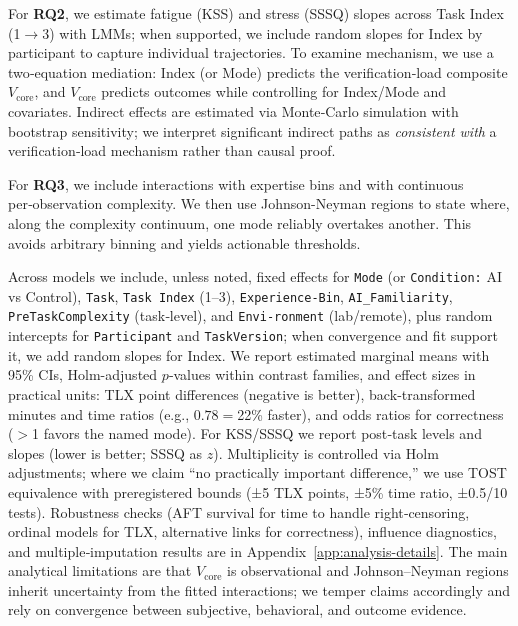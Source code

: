 \documentclass[sigconf]{acmart}
\begin{document}
For \textbf{RQ2}, we estimate fatigue (KSS) and stress (SSSQ) slopes across Task Index (1$\rightarrow$3) with LMMs; when supported, we include random slopes for Index by participant to capture individual trajectories. To examine mechanism, we use a two‑equation mediation: Index (or Mode) predicts the verification‑load composite $V_{\text{core}}$, and $V_{\text{core}}$ predicts outcomes while controlling for Index/Mode and covariates. Indirect effects are estimated via Monte‑Carlo simulation with bootstrap sensitivity; we interpret significant indirect paths as \emph{consistent with} a verification‑load mechanism rather than causal proof.

For \textbf{RQ3}, we include interactions with expertise bins and with continuous per‑observation complexity. We then use Johnson\hyp{}Neyman regions to state where, along the complexity continuum, one mode reliably overtakes another. This avoids arbitrary binning and yields actionable thresholds.

Across models we include, unless noted, fixed effects for \texttt{Mode} (or \texttt{Condition:} AI vs Control), \texttt{Task}, \texttt{Task Index} (1–3), \texttt{Experience-\allowbreak{}Bin}, \texttt{AI\_Familiarity}, \texttt{PreTaskComplexity} (task‑level), and \texttt{Envi-\allowbreak{}ronment} (lab/remote), plus random intercepts for \texttt{Participant} and \texttt{TaskVersion}; when convergence and fit support it, we add random slopes for Index. We report estimated marginal means with 95\% CIs, Holm-adjusted $p$‑values within contrast families, and effect sizes in practical units: TLX point differences (negative is better), back‑transformed minutes and time ratios (e.g., $0.78{=}$22\% faster), and odds ratios for correctness ($>$1 favors the named mode). For KSS/SSSQ we report post‑task levels and slopes (lower is better; SSSQ as $z$). Multiplicity is controlled via Holm adjustments; where we claim “no practically important difference,” we use TOST equivalence with preregistered bounds (±5 TLX points, ±5\% time ratio, ±0.5/10 tests). Robustness checks (AFT survival for time to handle right‑censoring, ordinal models for TLX, alternative links for correctness), influence diagnostics, and multiple‑imputation results are in Appendix~\ref{app:analysis-details}. The main analytical limitations are that $V_{\text{core}}$ is observational and Johnson–Neyman regions inherit uncertainty from the fitted interactions; we temper claims accordingly and rely on convergence between subjective, behavioral, and outcome evidence.
\end{document}
